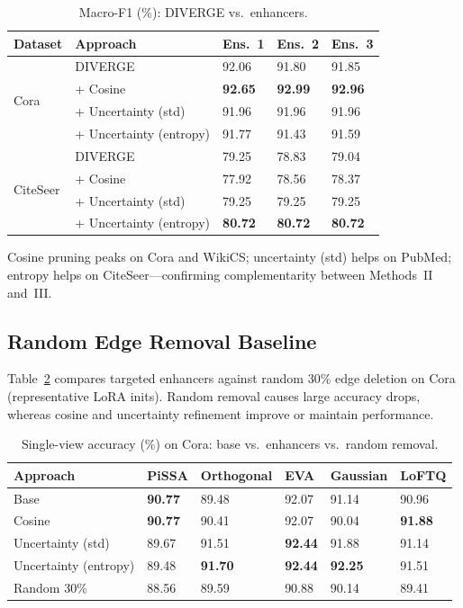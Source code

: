 \begin{table}[htbp]
\centering
\caption{Macro-F1 (\%): DIVERGE vs.\ enhancers.}
\label{tab:macro_f1_ensemble_after_enhancers}
\small
\begin{tabularx}{\textwidth}{l l *{3}{X}}
\toprule
Dataset & Approach & Ens.\ 1 & Ens.\ 2 & Ens.\ 3 \\
\midrule
\multirow{4}{*}{Cora}
 & DIVERGE & 92.06 & 91.80 & 91.85 \\
 & + Cosine & \textbf{92.65} & \textbf{92.99} & \textbf{92.96} \\
 & + Uncertainty (std) & 91.96 & 91.96 & 91.96 \\
 & + Uncertainty (entropy) & 91.77 & 91.43 & 91.59 \\
\midrule
\multirow{4}{*}{CiteSeer}
 & DIVERGE & 79.25 & 78.83 & 79.04 \\
 & + Cosine & 77.92 & 78.56 & 78.37 \\
 & + Uncertainty (std) & 79.25 & 79.25 & 79.25 \\
 & + Uncertainty (entropy) & \textbf{80.72} & \textbf{80.72} & \textbf{80.72} \\
\bottomrule
\end{tabularx}
\end{table}

Cosine pruning peaks on Cora and WikiCS; uncertainty (std) helps on PubMed; entropy
helps on CiteSeer---confirming complementarity between Methods~II and~III.


\subsection{Random Edge Removal Baseline}
Table~\ref{tab:compare_structural_enhancer_random_model} compares targeted enhancers
against random 30\% edge deletion on Cora (representative LoRA inits). Random removal
causes large accuracy drops, whereas cosine and uncertainty refinement improve or
maintain performance.

\begin{table}[htbp]
\centering
\caption{Single-view accuracy (\%) on Cora: base vs.\ enhancers vs.\ random removal.}
\label{tab:compare_structural_enhancer_random_model}
\small
\begin{tabularx}{\textwidth}{l *{5}{X}}
\toprule
Approach & PiSSA & Orthogonal & EVA & Gaussian & LoFTQ \\
\midrule
Base & \textbf{90.77} & 89.48 & 92.07 & 91.14 & 90.96 \\
Cosine & \textbf{90.77} & 90.41 & 92.07 & 90.04 & \textbf{91.88} \\
Uncertainty (std) & 89.67 & 91.51 & \textbf{92.44} & 91.88 & 91.14 \\
Uncertainty (entropy) & 89.48 & \textbf{91.70} & \textbf{92.44} & \textbf{92.25} & 91.51 \\
Random 30\% & 88.56 & 89.59 & 90.88 & 90.14 & 89.41 \\
\bottomrule
\end{tabularx}
\end{table}


